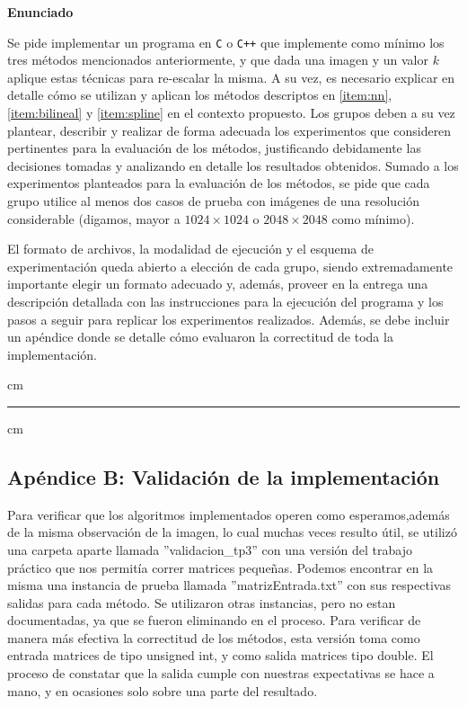 \documentclass[a4paper]{article}
\begin{document}
\vskip 5pt

{\bf\noindent Enunciado}

Se pide implementar un programa en \verb-C- o \verb-C++- que implemente como m\'inimo los tres m\'etodos mencionados anteriormente, y que dada una imagen y un valor $k$ aplique estas t\'ecnicas para re-escalar la misma. A su vez, es necesario explicar en detalle c\'omo se utilizan y aplican los m\'etodos descriptos en \ref{item:nn}, \ref{item:bilineal} y \ref{item:spline} en el contexto propuesto. Los grupos deben a su vez plantear, describir y realizar de forma adecuada los experimentos que consideren pertinentes para la evaluaci\'on de los m\'etodos, justificando debidamente las decisiones tomadas y analizando en detalle los resultados obtenidos. Sumado a los experimentos planteados para la evaluaci\'on de los m\'etodos, se pide que cada grupo utilice al menos dos casos de prueba con im\'agenes de una resoluci\'on considerable (digamos, mayor a $1024\times 1024$ o $2048\times 2048$ como m\'inimo).

El formato de archivos, la modalidad de ejecuci\'on y el esquema de experimentaci\'on queda abierto a elecci\'on de cada grupo, siendo extremadamente importante elegir un formato adecuado y, adem\'as, proveer en la entrega una descripci\'on detallada con las instrucciones para la ejecuci\'on del programa y los pasos a seguir para replicar los experimentos realizados. Adem\'as, se debe incluir un ap\'endice donde se detalle c\'omo evaluaron la correctitud de toda la implementaci\'on.

 cm
\hrule
{} cm


\subsection*{Apéndice B: Validación de la implementación}

Para verificar que los algoritmos implementados operen como esperamos,además de la misma observación de la imagen, lo cual muchas veces resulto útil, se utiliz\'o una carpeta aparte llamada ''validacion_tp3'' con una versión del trabajo práctico que nos permitía correr matrices pequeñas. Podemos encontrar en la misma una instancia de prueba llamada ''matrizEntrada.txt'' con sus respectivas salidas para cada método. Se utilizaron otras instancias, pero no estan documentadas, ya que se fueron eliminando en el proceso. Para verificar de manera m\'as efectiva la correctitud de los métodos, esta versión toma como entrada matrices de tipo unsigned int, y como salida matrices tipo double. El proceso de constatar que la salida cumple con nuestras expectativas se hace a mano, y en ocasiones solo sobre una parte del resultado.
\end{document}
